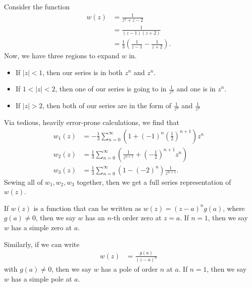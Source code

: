 \documentclass[10pt]{mypackage}
\begin{document}
\begin{example}
  Consider the function
  \begin{align*}
    w(z) &= \frac{1}{z^2 + z - 2}\\
         &= \frac{1}{\left( z- 1\right)\left( z+2 \right)}\\
         &= \frac{1}{3}\left( \frac{1}{z-1} - \frac{1}{z+2} \right).
  \end{align*}
  Now, we have three regions to expand $w$ in.
  \begin{itemize}
    \item If $\left\vert z \right\vert < 1$, then our series is in both $\displaystyle z^n$ and $\displaystyle z^n$.
    \item If $1 < \left\vert z \right\vert < 2$, then one of our series is going to in $\displaystyle \frac{1}{z^{n}}$ and one is in $\displaystyle z^n$.
    \item If $\left\vert z \right\vert > 2$, then both of our series are in the form of $\displaystyle \frac{1}{z^n}$ and $\displaystyle \frac{1}{z^n}$
  \end{itemize}
  Via tedious, heavily error-prone calculations, we find that
  \begin{align*}
    w_1(z) &= -\frac{1}{3}\sum_{n=0}^{\infty}\left( 1 + \left( -1 \right)^n \left( \frac{1}{2} \right)^{n+1} \right)z^n\\
    w_2(z) &= \frac{1}{3}\sum_{n=0}^{\infty}\left( \frac{1}{z^{n+1}} + \left( -\frac{1}{2} \right)^{n+1}z^n \right)\\
    w_3(z) &= \frac{1}{3} \sum_{n=0}^{\infty} \left( 1-\left( -2 \right)^n \right)\frac{1}{z^{n+1}}.
  \end{align*}
  Sewing all of $w_1,w_2,w_3$ together, then we get a full series representation of $w(z)$.
\end{example}
\begin{definition}
  If $w(z)$ is a function that can be written as $w(z) = \left( z-a \right)^ng(a)$, where $g(a)\neq 0$, then we say $w$ has an $n$-th order zero at $z=a$. If $n = 1$, then we say $w$ has a simple zero at $a$.\newline

  Similarly, if we can write
  \begin{align*}
    w(z) &= \frac{g(a)}{\left( z-a \right)^n}
  \end{align*}
  with $g(a)\neq 0$, then we say $w$ has a pole of order $n$ at $a$. If $n = 1$, then we say $w$ has a simple pole at $a$.
\end{definition}
\end{document}
